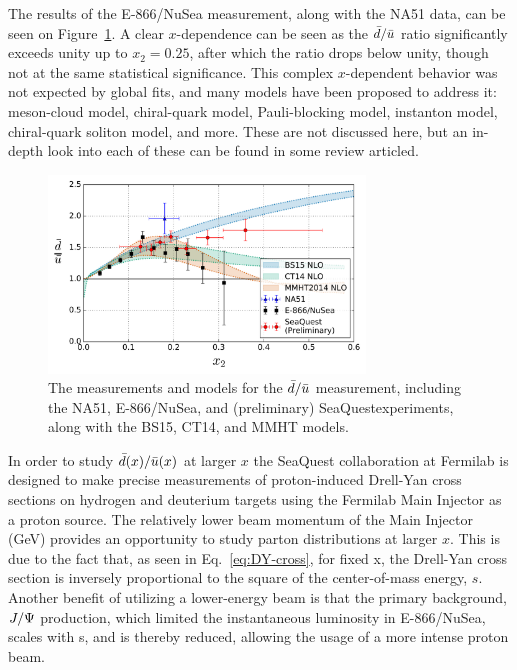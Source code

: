 The results of the E-866/NuSea measurement\cite{PhysRevLett.80.3715}, along with the NA51 data, can be seen on Figure~\ref{fig:dbar-ubar}. A clear $x$-dependence can be seen as the $\bar{d}/\bar{u}$ ratio significantly exceeds unity up to $x_2=0.25$, after which the ratio drops below unity, though not at the same statistical significance. This complex $x$-dependent behavior was not expected by global fits, and many models have been proposed to address it: meson-cloud model, chiral-quark model, Pauli-blocking model, instanton model, chiral-quark soliton model, and more. These are not discussed here, but an in-depth look into each of these can be found in some review articled\cite{Kumano:1997cy, Garvey:2001yq}.

\begin{figure}
	\centering
	\includegraphics[width=0.75\textwidth]{figures/background/dbar_ubar.png}
	\caption{The measurements and models for the $\bar{d}/\bar{u}$ measurement, including the NA51\cite{Baldit:1994jk}, E-866/NuSea\cite{PhysRevLett.80.3715}, and (preliminary) SeaQuest\CN experiments, along with the BS15, CT14, and MMHT models.}
	\label{fig:dbar-ubar}
\end{figure}

In order to study $\bar{d}(x)/\bar{u}(x)$ at larger $x$ the SeaQuest collaboration at Fermilab is designed to make precise measurements of proton-induced Drell-Yan cross sections on hydrogen and deuterium targets using the Fermilab Main Injector as a proton source. The relatively lower beam momentum of the Main Injector (\unit[120]{GeV}) provides an opportunity to study parton distributions at larger $x$. This is due to the fact that, as seen in Eq.~\ref{eq:DY-cross}, for fixed x, the Drell-Yan cross section is inversely proportional to the square of the center-of-mass energy, $s$. Another benefit of utilizing a lower-energy beam is that the primary background, $J/\Psi$ production, which limited the instantaneous luminosity in E-866/NuSea, scales with s, and is thereby reduced, allowing the usage of a more intense proton beam.


